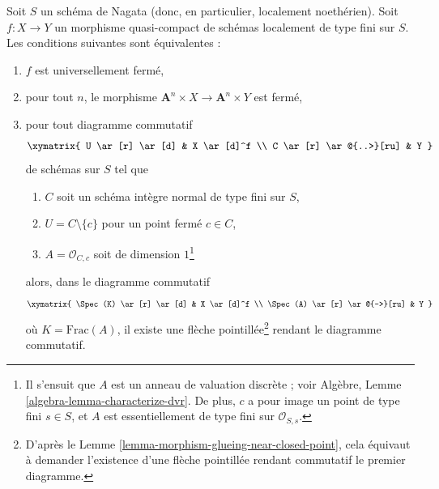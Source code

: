 \begin{lemma}
\label{lemma-essentially-finite-type-criterion-universally-closed}
Soit $S$ un schéma de Nagata (donc, en particulier, localement noethérien).
Soit $f : X \to Y$ un morphisme quasi-compact de schémas localement
de type fini sur $S$. Les conditions suivantes sont équivalentes :
\begin{enumerate}
\item $f$ est universellement fermé,
\item pour tout $n$, le morphisme
$\mathbf{A}^n \times X \to \mathbf{A}^n \times Y$ est fermé,
\item pour tout diagramme commutatif
$$
\xymatrix{
U \ar[r] \ar[d] & X \ar[d]^f \\
C \ar[r] \ar@{..>}[ru] & Y
}
$$
de schémas sur $S$ tel que
\begin{enumerate}
\item $C$ soit un schéma intègre normal de type fini sur $S$,
\item $U = C \setminus \{c\}$ pour un point fermé $c \in C$,
\item $A = \mathcal{O}_{C, c}$ soit de dimension $1$\footnote{Il s'ensuit
que $A$ est un anneau de valuation discrète ; voir
Algèbre, Lemme \ref{algebra-lemma-characterize-dvr}.
De plus, $c$ a pour image un point de type fini $s \in S$, et
$A$ est essentiellement de type fini sur $\mathcal{O}_{S, s}$.}
\end{enumerate}
alors, dans le diagramme commutatif
$$
\xymatrix{
\Spec(K) \ar[r] \ar[d] & X \ar[d]^f \\
\Spec(A) \ar[r] \ar@{-->}[ru] & Y
}
$$
où $K = \text{Frac}(A)$, il existe une flèche pointillée\footnote{D'après le
Lemme \ref{lemma-morphism-glueing-near-closed-point}, cela
équivaut à demander l'existence d'une flèche pointillée
rendant commutatif le premier diagramme.}
rendant le diagramme commutatif.
\end{enumerate}
\end{lemma}

